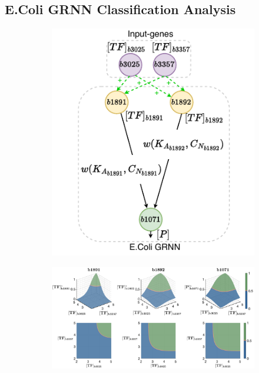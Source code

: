 \documentclass[twocolumn]{biophys-new}
\begin{document}
{{%

\vspace{-0.5em}
\subsection*{E.Coli GRNN Classification Analysis}  
\begin{figure}[!ht]
    \centering
    \begin{subfigure}{0.25\textwidth} %
        \includegraphics[width=\columnwidth]{figures/eval_full_connect.pdf}
        \caption{}
        \label{fig:real_net} 
    \end{subfigure}
    \begin{subfigure}{0.6\textwidth} %
        \includegraphics[width=\columnwidth]{figures/eval_full_connect_graph.pdf}

\end{subfigure}
\end{figure}}}
\end{document}
